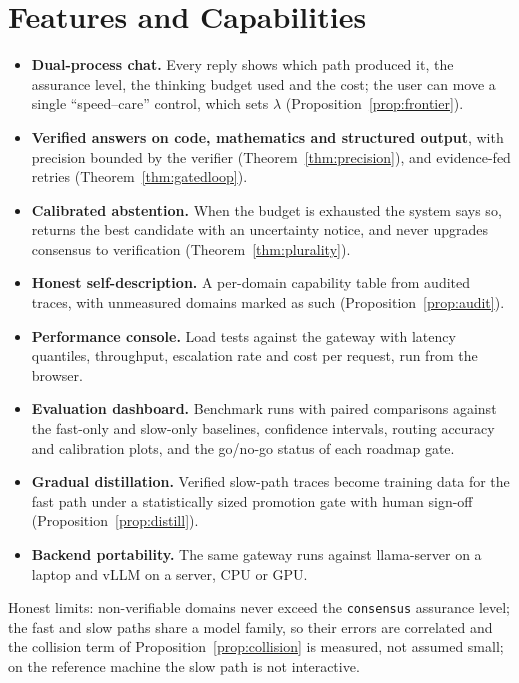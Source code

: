 \section{Features and Capabilities}
\label{sec:features}
\begin{itemize}
\item \textbf{Dual-process chat.} Every reply shows which path produced it,
the assurance level, the thinking budget used and the cost; the user can move
a single ``speed--care'' control, which sets $\lambda$
(Proposition~\ref{prop:frontier}).
\item \textbf{Verified answers on code, mathematics and structured output},
with precision bounded by the verifier (Theorem~\ref{thm:precision}), and
evidence-fed retries (Theorem~\ref{thm:gatedloop}).
\item \textbf{Calibrated abstention.} When the budget is exhausted the system
says so, returns the best candidate with an uncertainty notice, and never
upgrades consensus to verification (Theorem~\ref{thm:plurality}).
\item \textbf{Honest self-description.} A per-domain capability table from
audited traces, with unmeasured domains marked as such
(Proposition~\ref{prop:audit}).
\item \textbf{Performance console.} Load tests against the gateway with
latency quantiles, throughput, escalation rate and cost per request, run from
the browser.
\item \textbf{Evaluation dashboard.} Benchmark runs with paired comparisons
against the fast-only and slow-only baselines, confidence intervals, routing
accuracy and calibration plots, and the go/no-go status of each roadmap gate.
\item \textbf{Gradual distillation.} Verified slow-path traces become
training data for the fast path under a statistically sized promotion gate
with human sign-off (Proposition~\ref{prop:distill}).
\item \textbf{Backend portability.} The same gateway runs against
llama-server on a laptop and vLLM on a server, CPU or GPU.
\end{itemize}
Honest limits: non-verifiable domains never exceed the \texttt{consensus}
assurance level; the fast and slow paths share a model family, so their errors
are correlated and the collision term of Proposition~\ref{prop:collision} is
measured, not assumed small; on the reference machine the slow path is not
interactive.
